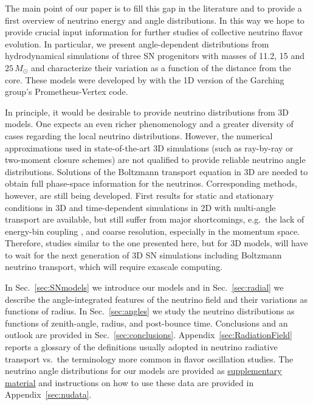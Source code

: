 \documentclass[iop,twocolappendix,numberedappendix]{emulateapj}
\begin{document}
 The main point of our paper is to fill this gap in the
  literature and to provide a first overview of neutrino energy and
  angle distributions.  In this way we hope to provide crucial input
  information for further studies of collective neutrino flavor
  evolution. In particular, we present angle-dependent distributions
  from hydrodynamical simulations of three SN progenitors with masses
  of 11.2, 15 and $25\,M_\odot$ and characterize their variation as a
  function of the distance from the core. These models were developed
  by \cite{Huedepohl:2013} with the 1D version of the Garching group's
  {\sc Prometheus-Vertex} code.


 In principle, it would be desirable to provide neutrino
  distributions from 3D models. One expects an even richer
  phenomenology and a greater diversity of cases regarding the local
  neutrino distributions. However, the numerical approximations used
  in state-of-the-art 3D simulations
(such as ray-by-ray or two-moment closure schemes)
 are not qualified to provide
  reliable neutrino angle distributions.
Solutions of the Boltzmann transport equation in 3D are needed
  to obtain full phase-space information for the neutrinos. Corresponding
  methods, however, are still being developed. First results for 
  static and stationary conditions in 3D \citep{Sumiyoshi:2014qua} 
  and time-dependent simulations in 2D \citep{Ott:2008jb,Brandt:2010xa,Nagakura:2017mnp}  with 
  multi-angle transport are available, but still suffer from
  major shortcomings, e.g.~the lack of energy-bin coupling
  \citep[]{Ott:2008jb,Brandt:2010xa}, and coarse resolution, especially in the momentum space.
  Therefore, studies similar to the one presented here, but
  for 3D models, will have to wait for the next generation of 
  3D SN simulations including Boltzmann neutrino transport,
  which will require exascale computing.

 In Sec.~\ref{sec:SNmodels} we introduce our models and in
  Sec.~\ref{sec:radial} we describe the angle-integrated features of
  the neutrino field and their variations as functions of radius. In
Sec.~\ref{sec:angles} we study the neutrino distributions as functions
of zenith-angle, radius, and post-bounce time. Conclusions and an
outlook are provided in Sec.~\ref{sec:conclusions}.
Appendix~\ref{sec:RadiationField} reports a glossary of the
definitions usually adopted in neutrino radiative transport vs.\ the
terminology more common in flavor oscillation studies. The neutrino
angle distributions for our models are provided as
\href{http://wwwmpa.mpa-garching.mpg.de/ccsnarchive/data/Tamborra2017/}
     {supplementary material} and instructions on how to use these
     data are provided in Appendix~\ref{sec:nudata}.
\end{document}
